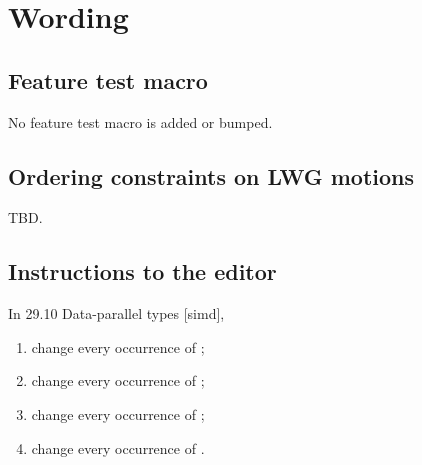 \section{Wording}

\subsection{Feature test macro}

No feature test macro is added or bumped.

\subsection{Ordering constraints on LWG motions}

TBD.

\subsection{Instructions to the editor}

In 29.10 Data-parallel types [simd],

\begin{enumerate}
  \item change every occurrence of ;
  \item change every occurrence of ;
  \item change every occurrence of ;
  \item change every occurrence of .
\end{enumerate}


